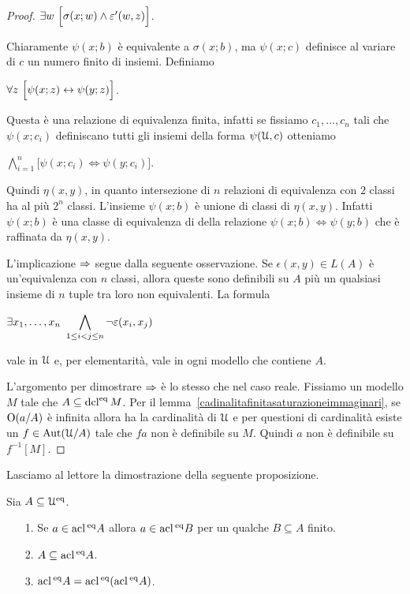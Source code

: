 \begin{proof}
$\exists w\  \Big[\sigma(x;w)\wedge\varepsilon'(w,z)\Big]$.

Chiaramente $\psi(x;b)$ \`e equivalente a $\sigma(x;b)$, ma $\psi(x;c)$ definisce al variare di $c$ un numero finito di insiemi. Definiamo

$\forall z\  \Big[\psi(x;z)\leftrightarrow \psi(y;z)\Big]$.

Questa \`e una relazione di equivalenza finita,  infatti se fissiamo $c_1,\dots,c_n$ tali che $\psi(x;c_i)$ definiscano tutti gli insiemi della forma $\psi(\EuScript U,c)$ otteniamo 

$\displaystyle\bigwedge^n_{i=1} \Big[\psi(x;c_i)\iff \psi(y;c_i)\Big]$.

Quindi $\eta(x,y)$, in quanto intersezione di $n$ relazioni di equivalenza con $2$ classi ha al pi\`u $2^n$ classi. L'insieme $\psi(x;b)$ \`e unione di classi di $\eta(x,y)$. Infatti $\psi(x;b)$ \`e una classe di equivalenza di della relazione $\psi(x;b)\iff \psi(y;b)$ che \`e raffinata da $\eta(x,y)$.

L'implicazione $\Rightarrow$ segue dalla seguente osservazione. Se $\epsilon(x,y)\in L(A)$ \`e un'equivalenza con $n$ classi, allora queste sono definibili su $A$ pi\`u un qualsiasi insieme di $n$ tuple tra loro non equivalenti. La formula 

\hfil$\displaystyle\E x_1,\dots,x_n\ \bigwedge_{1\le i<j\le n}\neg\epsilon(x_i,x_j)$

vale in $\EuScript U$ e, per elementarit\`a, vale in ogni modello che contiene $A$.

L'argomento per dimostrare $\Rightarrow$ \`e lo stesso che nel caso reale. Fissiamo un modello $M$ tale che $A\subseteq\mathop{\rm dcl}^{\rm eq} M$. Per il lemma~\ref{cadinalitafinitasaturazioneimmaginari}, se $\textrm{O}(a/A)$ \`e infinita allora ha la cardinalit\`a di $\EuScript U$ e per questioni di cardinalit\`a esiste un $f\in\textrm{Aut}(\EuScript U/A)$ tale che $fa$ non \`e definibile su $M$. Quindi $a$ non \`e definibile su $f^{-1}[M]$.
\end{proof}

Lasciamo al lettore la dimostrazione della seguente proposizione.

\begin{proposition}\label{acl123} Sia $A\subseteq\EuScript U^{\rm eq}$.
\begin{itemize}
\item[1.]  Se $a\in\mathop{\rm acl}\/^{\rm eq} A$ allora $a\in\mathop{\rm acl}\/^{\rm eq} B$ per un qualche $B\subseteq A$ finito.
\item[2.]  $A\subseteq \mathop{\rm acl}\/^{\rm eq} A$.
\item[3.]  $\mathop{\rm acl}\/^{\rm eq} A=\mathop{\rm acl}\/^{\rm eq}(\mathop{\rm acl}\/^{\rm eq} A)$.\QED
\end{itemize} 
\end{proposition}

